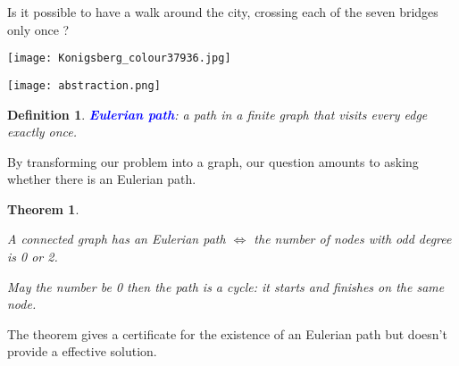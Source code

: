 \documentclass[10pt]{report}
\numberwithin{dummy}{section}
\theoremstyle{ocrenumbox}
\newtheorem{definitionTTT}{Theorem}[]
\theoremstyle{grayman}
\newtheorem{definitionTTTT}{Definition}[]
\newenvironment{thm}{\begin{tBox}\begin{definitionTTT}}{\end{definitionTTT}\end{tBox}}
\newenvironment{voc}{\begin{vBox}\begin{definitionTTTT}}{\end{definitionTTTT}\end{vBox}}
\begin{document}
\begin{minipage}{0.5\textwidth}
\begin{center}
\end{center}
\end{minipage}
\newpage\phantom{a}
Is it possible to have a walk around the city, crossing each of the seven bridges only once ?\\
\begin{minipage}{0.5\textwidth}
    \begin{center}
    \texttt{[image: Konigsberg\_colour37936.jpg]}
    \end{center}
\end{minipage}
\begin{minipage}{0.5\textwidth}
    \begin{center}
    \texttt{[image: abstraction.png]}
    \end{center}
\end{minipage}
\begin{voc}
    \textbf{\textcolor{blue}{Eulerian path}}: a path in a finite graph that visits every edge exactly once.
\end{voc}
By transforming our problem into a graph, our question amounts to asking whether there is an Eulerian path.
\begin{thm}\leavevmode
    \begin{center}
        A connected graph has an Eulerian path $\Longleftrightarrow$ the number of nodes with odd degree is 0 or 2.
    \end{center}
May the number be 0 then the path is a cycle: it starts and finishes on the same node.
\end{thm}
The theorem gives a certificate for the existence of an
Eulerian path but doesn't provide a effective solution.\\\\
\begin{minipage}{0.5\textwidth}
\begin{center}
\end{center}
\end{minipage}
\end{document}
